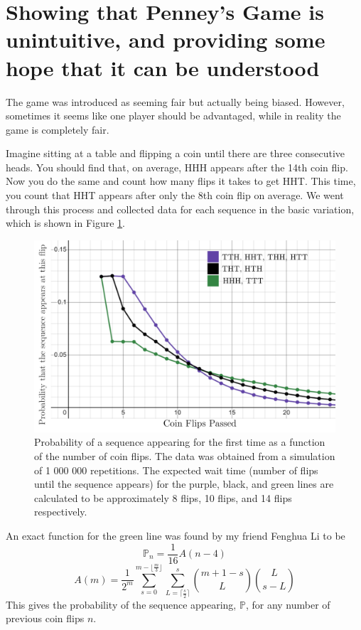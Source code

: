 \documentclass[english,12pt,a4paper,final]{article}
\begin{document}
\part{Showing that Penney's Game is unintuitive, and providing some hope that it can be understood}

The game was introduced as seeming fair but actually being biased. However, sometimes it seems like one player should be advantaged, while in reality the game is completely fair.

Imagine sitting at a table and flipping a coin until there are three consecutive heads. You should find that, on average, HHH appears after the 14th coin flip. Now you do the same and count how many flips it takes to get HHT. This time, you count that HHT appears after only the 8th coin flip on average. We went through this process and collected data for each sequence in the basic variation, which is shown in Figure \ref{fig:probGraph}.

\newpage

\begin{figure}
	\centering
	\includegraphics[width=0.7\linewidth]{"./prob graph"}
	\caption{Probability of a sequence appearing for the first time as a function of the number of coin flips. The data was obtained from a simulation of 1 000 000 repetitions. The expected wait time (number of flips until the sequence appears) for the purple, black, and green lines are calculated to be approximately 8 flips, 10 flips, and 14 flips respectively.}
	\label{fig:probGraph}
\end{figure}

An exact function for the green line was found by my friend Fenghua Li to be 
\begin{equation*}
	\mathbb{P}_n=\frac{1}{16} A(n-4)
\end{equation*}
\begin{equation*}
	A(m) = \frac{1}{2^m}\sum_{s=0}^{m- \lfloor \frac{m}{3} \rfloor}\sum_{L=\lceil \frac{s}{2} \rceil}^{s} {m+1-s \choose L} {L \choose s-L}
\end{equation*}
This gives the probability of the sequence appearing, $\mathbb{P}$, for any number of previous coin flips $n$.
\end{document}
